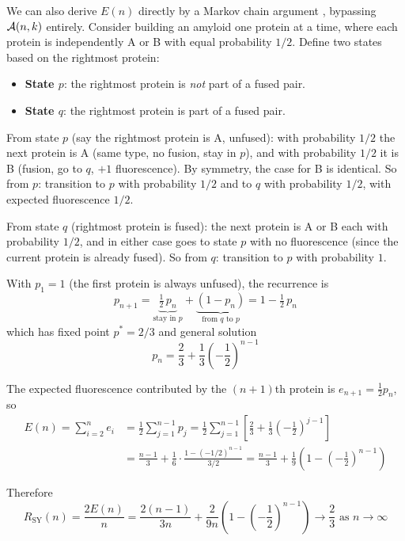 \documentclass[11pt]{article}
\newcommand{\cA}{ {\cal A} }
\begin{document}
We can also derive $E(n)$ directly by a Markov chain argument \cite{norris1997}, bypassing $\cA(n,k)$ entirely. Consider building an amyloid one protein at a time, where each protein is independently A or B with equal probability $1/2$. Define two states based on the rightmost protein:
\begin{itemize}
\item \textbf{State $p$}: the rightmost protein is \textit{not} part of a fused pair.
\item \textbf{State $q$}: the rightmost protein is part of a fused pair.
\end{itemize}

From state $p$ (say the rightmost protein is A, unfused): with probability $1/2$ the next protein is A (same type, no fusion, stay in $p$), and with probability $1/2$ it is B (fusion, go to $q$, $+1$ fluorescence). By symmetry, the case for B is identical. So from $p$: transition to $p$ with probability $1/2$ and to $q$ with probability $1/2$, with expected fluorescence $1/2$.

From state $q$ (rightmost protein is fused): the next protein is A or B each with probability $1/2$, and in either case goes to state $p$ with no fluorescence (since the current protein is already fused). So from $q$: transition to $p$ with probability $1$.

With $p_1 = 1$ (the first protein is always unfused), the recurrence is
\[
p_{n+1} = \underbrace{\tfrac{1}{2}\, p_n}_{\text{stay in }p} + \underbrace{(1 - p_n)}_{\text{from }q\text{ to }p} = 1 - \tfrac{1}{2}\, p_n
\]
which has fixed point $p^* = 2/3$ and general solution
\[
p_n = \frac{2}{3} + \frac{1}{3}\left(-\frac{1}{2}\right)^{n-1}
\]

The expected fluorescence contributed by the $(n+1)$th protein is $e_{n+1} = \frac{1}{2} p_n$, so
\begin{align*}
E(n) = \sum_{i=2}^{n} e_i &= \frac{1}{2} \sum_{j=1}^{n-1} p_j = \frac{1}{2} \sum_{j=1}^{n-1} \left[ \frac{2}{3} + \frac{1}{3}\left(-\frac{1}{2}\right)^{j-1} \right] \\
&= \frac{n-1}{3} + \frac{1}{6} \cdot \frac{1 - (-1/2)^{n-1}}{3/2} = \frac{n-1}{3} + \frac{1}{9}\left(1 - \left(-\frac{1}{2}\right)^{n-1}\right)
\end{align*}

Therefore
\[
R_{\text{SY}}(n) = \frac{2E(n)}{n} = \frac{2(n-1)}{3n} + \frac{2}{9n}\left(1 - \left(-\frac{1}{2}\right)^{n-1}\right) \longrightarrow \frac{2}{3} \text{ as } n \to \infty
\]
\end{document}
